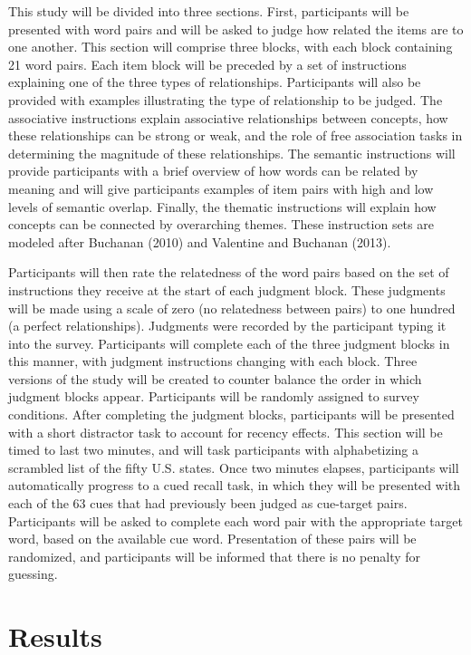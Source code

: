 \documentclass[english,man]{apa6}
\theoremstyle{definition}
\theoremstyle{definition}
\theoremstyle{definition}
\theoremstyle{remark}
\begin{document}
This study will be divided into three sections. First, participants will
be presented with word pairs and will be asked to judge how related the
items are to one another. This section will comprise three blocks, with
each block containing 21 word pairs. Each item block will be preceded by
a set of instructions explaining one of the three types of
relationships. Participants will also be provided with examples
illustrating the type of relationship to be judged. The associative
instructions explain associative relationships between concepts, how
these relationships can be strong or weak, and the role of free
association tasks in determining the magnitude of these relationships.
The semantic instructions will provide participants with a brief
overview of how words can be related by meaning and will give
participants examples of item pairs with high and low levels of semantic
overlap. Finally, the thematic instructions will explain how concepts
can be connected by overarching themes. These instruction sets are
modeled after Buchanan (2010) and Valentine and Buchanan (2013).

Participants will then rate the relatedness of the word pairs based on
the set of instructions they receive at the start of each judgment
block. These judgments will be made using a scale of zero (no
relatedness between pairs) to one hundred (a perfect relationships).
Judgments were recorded by the participant typing it into the survey.
Participants will complete each of the three judgment blocks in this
manner, with judgment instructions changing with each block. Three
versions of the study will be created to counter balance the order in
which judgment blocks appear. Participants will be randomly assigned to
survey conditions. After completing the judgment blocks, participants
will be presented with a short distractor task to account for recency
effects. This section will be timed to last two minutes, and will task
participants with alphabetizing a scrambled list of the fifty U.S.
states. Once two minutes elapses, participants will automatically
progress to a cued recall task, in which they will be presented with
each of the 63 cues that had previously been judged as cue-target pairs.
Participants will be asked to complete each word pair with the
appropriate target word, based on the available cue word. Presentation
of these pairs will be randomized, and participants will be informed
that there is no penalty for guessing.

\section{Results}\label{results}
\end{document}
